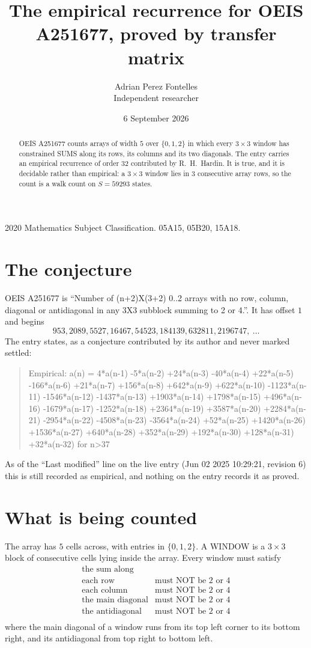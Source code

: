 \documentclass[11pt,a4paper]{article}
\title{The empirical recurrence for OEIS A251677, proved by transfer matrix}
\author{Adrian Perez Fontelles\\ \small Independent researcher}
\date{6 September 2026}
\theoremstyle{plain}
\theoremstyle{definition}
\begin{document}
\maketitle

\begin{abstract}
OEIS A251677 counts arrays of width $5$ over $\{0,1,2\}$ in which every $3\times3$ window has
constrained SUMS along its rows, its columns and its two diagonals. The entry carries an
empirical recurrence of order $32$ contributed by R.~H.~Hardin. It is true, and it is
decidable rather than empirical: a $3\times3$ window lies in $3$ consecutive array rows,
so the count is a walk count on $S=59293$ states.
\end{abstract}

\noindent\small 2020 Mathematics Subject Classification. 05A15, 05B20, 15A18.\normalsize

\section{The conjecture}

OEIS A251677 is ``Number of (n+2)X(3+2) 0..2 arrays with no row, column, diagonal or antidiagonal in any 3X3 subblock summing to 2 or 4.''. It has offset $1$ and begins
\[
953, 2089, 5527, 16467, 54523, 184139, 632811, 2196747,\ \dots
\]
The entry states, as a conjecture contributed by its author and never marked settled:
\begin{quote}
Empirical: a(n) = 4*a(n-1) -5*a(n-2) +24*a(n-3) -40*a(n-4) +22*a(n-5) -166*a(n-6) +21*a(n-7) +156*a(n-8) +642*a(n-9) +622*a(n-10) -1123*a(n-11) -1546*a(n-12) -1437*a(n-13) +1903*a(n-14) +1798*a(n-15) +496*a(n-16) -1679*a(n-17) -1252*a(n-18) +2364*a(n-19) +3587*a(n-20) +2284*a(n-21) -2954*a(n-22) -4508*a(n-23) -3564*a(n-24) +52*a(n-25) +1420*a(n-26) +1536*a(n-27) +640*a(n-28) +352*a(n-29) +192*a(n-30) +128*a(n-31) +32*a(n-32) for n>37
\end{quote}
As of the ``Last modified'' line on the live entry (Jun 02 2025 10:29:21, revision 6) this is still
recorded as empirical, and nothing on the entry records it as proved.

\section{What is being counted}

The array has $5$ cells across, with entries in $\{0,1,2\}$. A WINDOW is a $3\times3$ block
of consecutive cells lying inside the array. Every window must satisfy
\[
\begin{array}{ll}
\text{the sum along} & \text{} \\[2pt]
\text{each row} & \text{must NOT be 2 or 4} \\
\text{each column} & \text{must NOT be 2 or 4} \\
\text{the main diagonal} & \text{must NOT be 2 or 4} \\
\text{the antidiagonal} & \text{must NOT be 2 or 4} \\
\end{array}
\]
where the main diagonal of a window runs from its top left corner to its bottom right, and its
antidiagonal from top right to bottom left.
\end{document}
